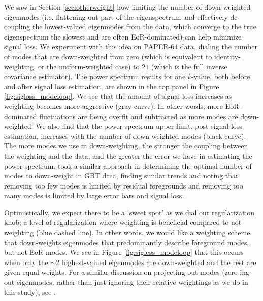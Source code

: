 \documentclass[preprint2,numberedappendix,tighten]{aastex6}
\begin{document}
We saw in Section \ref{sec:otherweight} how limiting the number of down-weighted eigenmodes (i.e. flattening out part of the 
eigenspectrum and effectively de-coupling the lowest-valued eigenmodes from the data, which converge to the true eigenspectrum the slowest and are often EoR-dominated) can help minimize signal loss. We experiment with this idea on PAPER-64 data, dialing the number of modes 
that are down-weighted from zero (which is equivalent to identity-weighting, or the uniform-weighted case) to $21$ (which is the full inverse 
covariance estimator). The power spectrum results for one $k$-value, both before and after signal loss 
estimation, are shown in the top panel in Figure \ref{fig:sigloss_modeloop}. We see that the amount of signal loss increases as weighting 
becomes more aggressive (gray curve). In other words, more EoR-dominated fluctuations are being overfit and 
subtracted as more modes are down-weighted. We also find that the power spectrum upper limit, post-signal loss estimation, 
increases with the number of down-weighted modes (black curve). The more modes we use in down-weighting, the stronger the coupling between the weighting and the data, and the greater the error we have in estimating the power spectrum. \citet{switzer_et_al2013} took a similar approach in determining the optimal number of modes to down-weight in GBT data, finding similar trends and noting that removing too few modes is limited by residual foregrounds and removing too many modes is limited by large error bars and signal loss.

Optimistically, we expect there to be a `sweet spot' as we dial our regularization knob; a level of regularization where weighting 
is beneficial compared to not weighting (blue dashed line). In other words, we would like a weighting scheme that down-weights eigenmodes that predominantly describe foreground modes, but not EoR modes. We see in Figure \ref{fig:sigloss_modeloop} that this occurs when 
only the $\sim2$ highest-valued eigenmodes are down-weighted and the rest are given equal weights. For a similar discussion on projecting out modes (zero-ing out eigenmodes, rather than just ignoring their relative weightings as we do in this study), see \citet{switzer_et_al2013}. 
\end{document}
